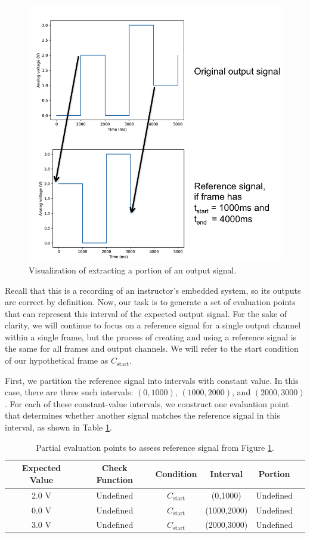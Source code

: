 \documentclass[12pt]{article}
\begin{document}
\begin{figure}[ht]
\centering
\includegraphics[width=0.6\linewidth]{output-framing.png}
\caption{Visualization of extracting a portion of an output signal.}
\label{fig:output-framing}
\end{figure}

Recall that this is a recording of an instructor's embedded system, so its outputs are correct by definition.  Now, our task is to generate a set of evaluation points that can represent this interval of the expected output signal.  For the sake of clarity, we will continue to focus on a reference signal for a single output channel within a single frame, but the process of creating and using a reference signal is the same for all frames and output channels.  We will refer to the start condition of our hypothetical frame as $C_{\text{start}}$.

First, we partition the reference signal into intervals with constant value.  In this case, there are three such intervals: $(0,1000)$, $(1000,2000)$, and $(2000,3000)$.  For each of these constant-value intervals, we construct one evaluation point that determines whether another signal matches the reference signal in this interval, as shown in Table \ref{table:construct-points}.

\begin{table}[ht]
\begin{center}
\caption{Partial evaluation points to assess reference signal from Figure \ref{fig:output-framing}.}
\label{table:construct-points}
\begin{tabular}{cccccc}
Expected Value & Check Function & Condition & Interval & Portion \\ \hline
2.0 V & Undefined & $C_{\text{start}}$ & (0,1000) & Undefined \\
0.0 V & Undefined & $C_{\text{start}}$ & (1000,2000) & Undefined \\
3.0 V & Undefined & $C_{\text{start}}$ & (2000,3000) & Undefined \\ \hline
\end{tabular}
\end{center}
\end{table}
\end{document}
